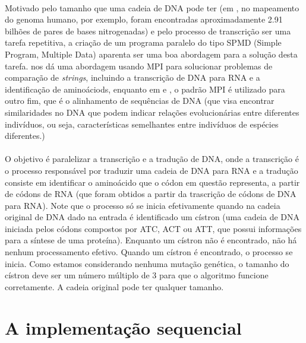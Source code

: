 \documentclass[a4paper,10pt]{article}
\begin{document}
\paragraph{}Motivado pelo tamanho que uma cadeia de DNA pode ter (em \citet{venter2001sequence}, no mapeamento do genoma humano, por exemplo, foram encontradas aproximadamente 2.91 bilhões de pares de bases nitrogenadas) e pelo processo de transcrição ser uma tarefa repetitiva, a criação de um programa paralelo do tipo SPMD (Simple Program, Multiple Data) aparenta ser uma boa abordagem para a solução desta tarefa. \citet{chibli2008multiprocessor} nos dá uma abordagem usando MPI para solucionar problemas de comparação de \emph{strings}, incluindo a transcrição de DNA para RNA e a identificação de aminoáciods, enquanto em \citet{kleinjung2002parallelized} e \citet{xue2014parallel}, o padrão MPI é utilizado para outro fim, que é o alinhamento de sequências de DNA (que visa encontrar similaridades no DNA que podem indicar relações evolucionárias entre diferentes indivíduos, ou seja, características semelhantes entre indivíduos de espécies diferentes.)\\ 
\paragraph{}O objetivo é paralelizar a transcrição e a tradução de DNA, onde a transcrição é o processo responsável por traduzir uma cadeia de DNA para RNA e a tradução consiste em identificar o aminoácido que o códon em questão representa, a partir de códons de RNA (que foram obtidos a partir da trascrição de códons de DNA para RNA). Note que o processo só se inicia efetivamente quando na cadeia original de DNA dado na entrada é identificado um cístron (uma cadeia de DNA iniciada pelos códons compostos por ATC, ACT ou ATT, que possui informações para a síntese de uma proteína). Enquanto um cístron não é encontrado, não há nenhum processamento efetivo. Quando um cístron é encontrado, o processo se inicia. Como estamos considerando nenhuma mutação genética, o tamanho do cístron deve ser um número múltiplo de 3 para que o algoritmo funcione corretamente. A cadeia original pode ter qualquer tamanho.\\
\newpage

\section{A implementação sequencial}
\end{document}
